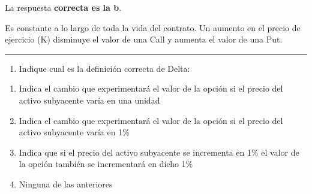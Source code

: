 \documentclass[
  letterpaper,
  DIV=11,
  numbers=noendperiod]{scrreprt}
\providecommand{\tightlist}{%
  \setlength{\itemsep}{0pt}\setlength{\parskip}{0pt}}\usepackage{longtable,booktabs,array}
\begin{document}
\begin{tcolorbox}[enhanced jigsaw, left=2mm, opacityback=0, colback=white, breakable, arc=.35mm, bottomrule=.15mm, rightrule=.15mm, toprule=.15mm, leftrule=.75mm, colframe=quarto-callout-tip-color-frame]
\begin{minipage}[t]{5.5mm}
\textcolor{quarto-callout-tip-color}{\faLightbulb}
\end{minipage}%
\begin{minipage}[t]{\textwidth - 5.5mm}

La respuesta \textbf{correcta es la b}.

Es constante a lo largo de toda la vida del contrato. Un aumento en el
precio de ejercicio (K) disminuye el valor de una Call y aumenta el
valor de una Put.

\end{minipage}%
\end{tcolorbox}

\begin{center}\rule{0.5\linewidth}{0.5pt}\end{center}

\begin{enumerate}
\def\labelenumi{\arabic{enumi}.}
\setcounter{enumi}{23}
\tightlist
\item
  Indique cual es la definición correcta de Delta:
\end{enumerate}

\begin{enumerate}
\def\labelenumi{\alph{enumi})}
\item
  Indica el cambio que experimentará el valor de la opción si el precio
  del activo subyacente varía en una unidad
\item
  Indica el cambio que experimentará el valor de la opción si el precio
  del activo subyacente varía en 1\%
\item
  Indica que si el precio del activo subyacente se incrementa en 1\% el
  valor de la opción también se incrementará en dicho 1\%
\item
  Ninguna de las anteriores
\end{enumerate}
\end{document}

